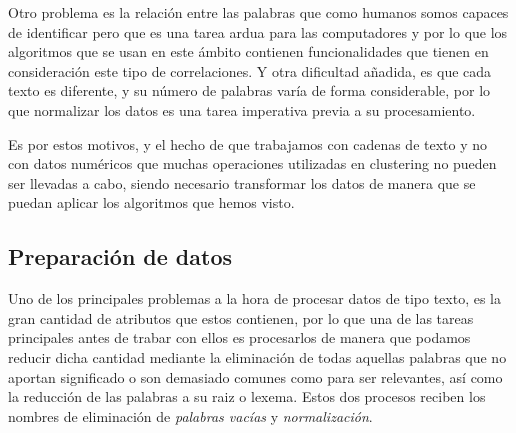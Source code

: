 \documentclass[10pt, a4paper]{article}
\begin{document}
Otro problema es la relación entre las palabras que como humanos somos capaces de identificar pero que es una tarea ardua para las computadores y por lo que los algoritmos que se usan en este ámbito contienen funcionalidades que tienen en consideración este tipo de correlaciones. Y otra dificultad añadida, es que cada texto es diferente, y su número de palabras varía de forma considerable, por lo que normalizar los datos es una tarea imperativa previa a su procesamiento. 

Es por estos motivos, y el hecho de que trabajamos con cadenas de texto y no con datos numéricos que muchas operaciones utilizadas en clustering no pueden ser llevadas a cabo, siendo necesario transformar los datos de manera que se puedan aplicar los algoritmos que hemos visto.



\subsection{Preparación de datos}

Uno de los principales problemas a la hora de procesar datos de tipo texto, es la gran cantidad de atributos que estos contienen, por lo que una de las tareas principales antes de trabar con ellos es procesarlos de manera que podamos reducir dicha cantidad mediante la eliminación de todas aquellas palabras que no aportan significado o son demasiado comunes como para ser relevantes, así como la reducción de las palabras a su raiz o lexema. Estos dos procesos reciben los nombres de eliminación de \textit{palabras vacías} y \textit{normalización}.
\end{document}
